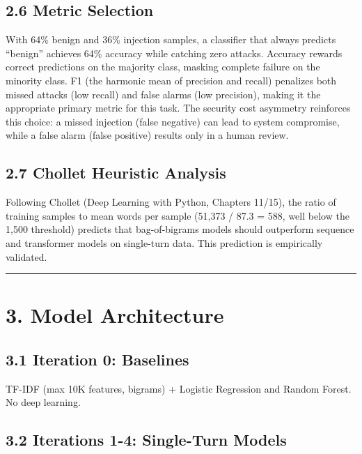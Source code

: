 \documentclass[
  11pt,
]{report}
\begin{document}
\subsection{2.6 Metric Selection}\label{metric-selection}

With 64\% benign and 36\% injection samples, a classifier that always
predicts ``benign'' achieves 64\% accuracy while catching zero attacks.
Accuracy rewards correct predictions on the majority class, masking
complete failure on the minority class. F1 (the harmonic mean of
precision and recall) penalizes both missed attacks (low recall) and
false alarms (low precision), making it the appropriate primary metric
for this task. The security cost asymmetry reinforces this choice: a
missed injection (false negative) can lead to system compromise, while a
false alarm (false positive) results only in a human review.

\subsection{2.7 Chollet Heuristic
Analysis}\label{chollet-heuristic-analysis}

Following Chollet (Deep Learning with Python, Chapters 11/15), the ratio
of training samples to mean words per sample (51,373 / 87.3 = 588, well
below the 1,500 threshold) predicts that bag-of-bigrams models should
outperform sequence and transformer models on single-turn data. This
prediction is empirically validated.

\begin{center}\rule{0.5\linewidth}{0.5pt}\end{center}

\section{3. Model Architecture}\label{model-architecture}

\subsection{3.1 Iteration 0: Baselines}\label{iteration-0-baselines}

TF-IDF (max 10K features, bigrams) + Logistic Regression and Random
Forest. No deep learning.

\subsection{3.2 Iterations 1-4: Single-Turn
Models}\label{iterations-1-4-single-turn-models}
\end{document}
